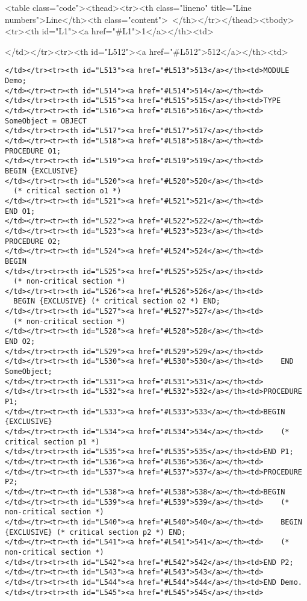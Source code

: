 <table class="code"><thead><tr><th class="lineno" title="Line numbers">Line</th><th class="content"> </th></tr></thead><tbody><tr><th id="L1"><a href="#L1">1</a></th><td>\documentclass[a4paper,11pt]{article}
\begin{document}
</td></tr><tr><th id="L512"><a href="#L512">512</a></th><td>\begin{lstlisting}[language=Oberon,frame=none,caption=Usage of exclusive blocks]
</td></tr><tr><th id="L513"><a href="#L513">513</a></th><td>MODULE Demo;
</td></tr><tr><th id="L514"><a href="#L514">514</a></th><td>
</td></tr><tr><th id="L515"><a href="#L515">515</a></th><td>TYPE
</td></tr><tr><th id="L516"><a href="#L516">516</a></th><td>    SomeObject = OBJECT
</td></tr><tr><th id="L517"><a href="#L517">517</a></th><td>
</td></tr><tr><th id="L518"><a href="#L518">518</a></th><td>        PROCEDURE O1;
</td></tr><tr><th id="L519"><a href="#L519">519</a></th><td>        BEGIN {EXCLUSIVE}
</td></tr><tr><th id="L520"><a href="#L520">520</a></th><td>            (* critical section o1 *)
</td></tr><tr><th id="L521"><a href="#L521">521</a></th><td>        END O1;
</td></tr><tr><th id="L522"><a href="#L522">522</a></th><td>
</td></tr><tr><th id="L523"><a href="#L523">523</a></th><td>        PROCEDURE O2;
</td></tr><tr><th id="L524"><a href="#L524">524</a></th><td>        BEGIN
</td></tr><tr><th id="L525"><a href="#L525">525</a></th><td>            (* non-critical section *)
</td></tr><tr><th id="L526"><a href="#L526">526</a></th><td>            BEGIN {EXCLUSIVE} (* critical section o2 *) END;
</td></tr><tr><th id="L527"><a href="#L527">527</a></th><td>            (* non-critical section *)
</td></tr><tr><th id="L528"><a href="#L528">528</a></th><td>        END O2;
</td></tr><tr><th id="L529"><a href="#L529">529</a></th><td>
</td></tr><tr><th id="L530"><a href="#L530">530</a></th><td>    END SomeObject;
</td></tr><tr><th id="L531"><a href="#L531">531</a></th><td>
</td></tr><tr><th id="L532"><a href="#L532">532</a></th><td>PROCEDURE P1;
</td></tr><tr><th id="L533"><a href="#L533">533</a></th><td>BEGIN {EXCLUSIVE}
</td></tr><tr><th id="L534"><a href="#L534">534</a></th><td>    (* critical section p1 *)
</td></tr><tr><th id="L535"><a href="#L535">535</a></th><td>END P1;
</td></tr><tr><th id="L536"><a href="#L536">536</a></th><td>
</td></tr><tr><th id="L537"><a href="#L537">537</a></th><td>PROCEDURE P2;
</td></tr><tr><th id="L538"><a href="#L538">538</a></th><td>BEGIN
</td></tr><tr><th id="L539"><a href="#L539">539</a></th><td>    (* non-critical section *)
</td></tr><tr><th id="L540"><a href="#L540">540</a></th><td>    BEGIN {EXCLUSIVE} (* critical section p2 *) END;
</td></tr><tr><th id="L541"><a href="#L541">541</a></th><td>    (* non-critical section *)
</td></tr><tr><th id="L542"><a href="#L542">542</a></th><td>END P2;
</td></tr><tr><th id="L543"><a href="#L543">543</a></th><td>
</td></tr><tr><th id="L544"><a href="#L544">544</a></th><td>END Demo.
</td></tr><tr><th id="L545"><a href="#L545">545</a></th><td>\end{lstlisting}
\end{document}
